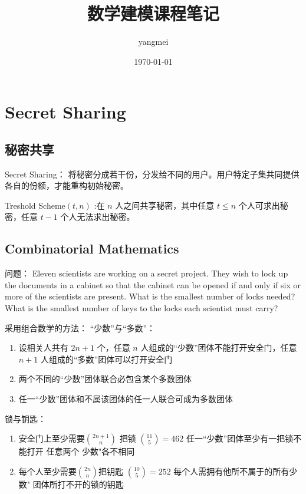 \documentclass[10t, a4paper, oneside]{ctexbook}
\title{{\Huge{\textbf{数学建模课程笔记}}}}
\author{yangmei}
\date{\today}
\begin{document}
\maketitle





\newpage
{}
\setcounter{page}{1}
\tableofcontents
\newpage
\setcounter{page}{1}
 
\chapter{Secret Sharing}
\section{秘密共享}

Secret Sharing： 将秘密分成若干份，分发给不同的用户。用户特定子集共同提供各自的份额，才能重构初始秘密。

Treshold Scheme$(t,n)$ :在 $n$ 人之间共享秘密，其中任意 $t\le n$ 个人可求出秘密，任意 $t-1$ 个人无法求出秘密。
\section{Combinatorial Mathematics}
问题：
Eleven scientists are working on a secret project. They wish to lock up the documents in a cabinet so that the cabinet can be opened if and only if six or more of the scientists are present. What is the smallest number of locks needed? What is the smallest number of keys to the locks each scientist must carry?

采用组合数学的方法：
“少数”与“多数”：
\begin{enumerate}
    \item 设相关人共有 $2n+1$ 个，任意 $n$ 人组成的“少数”团体不能打开安全门，任意 $n+1$ 人组成的“多数”团体可以打开安全门  
    \item 两个不同的“少数”团体联合必包含某个多数团体  
    \item 任一“少数”团体和不属该团体的任一人联合可成为多数团体        
\end{enumerate}
锁与钥匙：
\begin{enumerate}
    \item 安全门上至少需要$\binom{2n+1}n$ 把锁 $\binom{11}5=462$
    \subitem 任一“少数”团体至少有一把锁不能打开
    \subitem 任意两个 少数"各不相同
    \item 每个人至少需要$\binom{2n}n$把钥匙 $\binom{10}5 = 252$
    每个人需拥有他所不属于的所有少数" 团体所打不开的锁的钥匙 
\end{enumerate}
\end{document}
